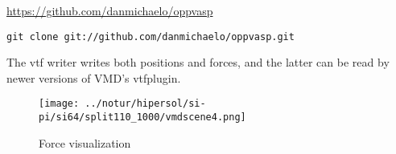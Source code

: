 \documentclass[11pt,bibliography=totoc,index=totoc]{scrbook}   %
\begin{document}
\url{https://github.com/danmichaelo/oppvasp}
\begin{lstlisting}
git clone git://github.com/danmichaelo/oppvasp.git
\end{lstlisting}

The vtf writer writes both positions and forces, and the latter can be read by newer versions of VMD's vtfplugin.

\begin{figure}[htp]
  \centering
  \texttt{[image: ../notur/hipersol/si-pi/si64/split110\_1000/vmdscene4.png]}
  \caption{Force visualization}
  \label{fig:forceviz}
\end{figure}



\end{document}
